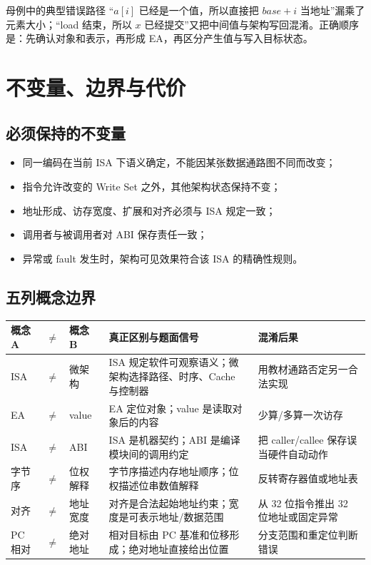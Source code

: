 \documentclass[UTF8,fontset=fandol,11pt,a4paper]{ctexart}
\begin{document}
\begin{warnbox}{母例中的典型错误路径}
“$a[i]$ 已经是一个值，所以直接把 $base+i$ 当地址”漏乘了元素大小；“load 结束，所以 $x$ 已经提交”又把中间值与架构写回混淆。正确顺序是：先确认对象和表示，再形成 EA，再区分产生值与写入目标状态。
\end{warnbox}

\section{不变量、边界与代价}

\subsection{必须保持的不变量}
\begin{itemize}
  \item 同一编码在当前 ISA 下语义确定，不能因某张数据通路图不同而改变；
  \item 指令允许改变的 Write Set 之外，其他架构状态保持不变；
  \item 地址形成、访存宽度、扩展和对齐必须与 ISA 规定一致；
  \item 调用者与被调用者对 ABI 保存责任一致；
  \item 异常或 fault 发生时，架构可见效果符合该 ISA 的精确性规则。
\end{itemize}

\subsection{五列概念边界}
\begin{center}
\small
\begin{tabularx}{\linewidth}{L{1.8cm}C{0.35cm}L{1.8cm}Y Y}
\toprule
概念 A & $\neq$ & 概念 B & 真正区别与题面信号 & 混淆后果\\
\midrule
ISA & $\neq$ & 微架构 & ISA 规定软件可观察语义；微架构选择路径、时序、Cache 与控制器 & 用教材通路否定另一合法实现\\
EA & $\neq$ & value & EA 定位对象；value 是读取对象后的内容 & 少算/多算一次访存\\
ISA & $\neq$ & ABI & ISA 是机器契约；ABI 是编译模块间的调用约定 & 把 caller/callee 保存误当硬件自动动作\\
字节序 & $\neq$ & 位权解释 & 字节序描述内存地址顺序；位权描述位串数值解释 & 反转寄存器值或地址表\\
对齐 & $\neq$ & 地址宽度 & 对齐是合法起始地址约束；宽度是可表示地址/数据范围 & 从 32 位指令推出 32 位地址或固定异常\\
PC 相对 & $\neq$ & 绝对地址 & 相对目标由 PC 基准和位移形成；绝对地址直接给出位置 & 分支范围和重定位判断错误\\
\bottomrule
\end{tabularx}
\end{center}
\end{document}
